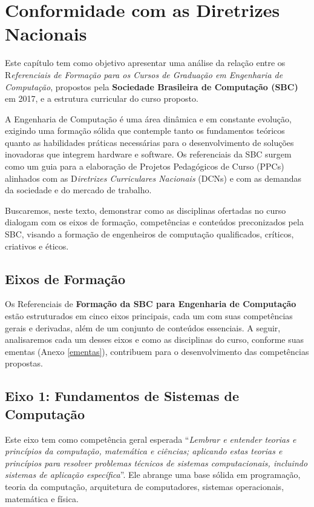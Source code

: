 \chapter{Conformidade com as Diretrizes Nacionais}
\thispagestyle{plain}

Este capítulo tem como objetivo apresentar uma análise da relação entre os R\textit{eferenciais de Formação para os Cursos de Graduação em Engenharia de Computação}, propostos pela \textbf{Sociedade Brasileira de Computação (SBC)} em 2017, e a estrutura curricular do curso proposto.

A Engenharia de Computação é uma área dinâmica e em constante evolução, exigindo uma formação sólida que contemple tanto os fundamentos teóricos quanto as habilidades práticas necessárias para o desenvolvimento de soluções inovadoras que integrem hardware e software. Os referenciais da SBC surgem como um guia para a elaboração de Projetos Pedagógicos de Curso (PPCs) alinhados com as D\textit{iretrizes Curriculares Nacionais} (DCNs) e com as demandas da sociedade e do mercado de trabalho.

Buscaremos, neste texto, demonstrar como as disciplinas ofertadas no curso dialogam com os eixos de formação, competências e conteúdos preconizados pela SBC, visando a formação de engenheiros de computação qualificados, críticos, criativos e éticos.

\section{Eixos de Formação}
Os Referenciais de \textbf{Formação da SBC para Engenharia de Computação }estão estruturados em cinco eixos principais, cada um com suas competências gerais e derivadas, além de um conjunto de conteúdos essenciais. A seguir, analisaremos cada um desses eixos e como as disciplinas do curso, conforme suas ementas (Anexo \ref{ementas}), contribuem para o desenvolvimento das competências propostas.

\section{Eixo 1: Fundamentos de Sistemas de Computação}
Este eixo tem como competência geral esperada ``\textit{Lembrar e entender teorias e princípios da computação, matemática e ciências; aplicando estas teorias e princípios para resolver problemas técnicos de sistemas computacionais, incluindo sistemas de aplicação específica}''. Ele abrange uma base sólida em programação, teoria da computação, arquitetura de computadores, sistemas operacionais, matemática e física.

